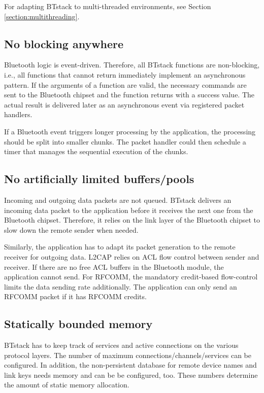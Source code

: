 \documentclass[a4paper,titlepage,oneside,12pt]{amsart} %
\begin{document}
For adapting BTstack to multi-threaded environments, see Section \ref{section:multithreading}.


\subsection{No blocking anywhere}

Bluetooth logic is event-driven. Therefore, all BTstack functions are non-blocking, i.e., all functions that cannot return immediately implement an asynchronous pattern. If the arguments of a function are valid, the necessary commands are sent to the Bluetooth chipset and the function returns with a success  value. The actual result is delivered later as an asynchronous event via registered packet handlers. 

If a Bluetooth event triggers longer processing by the application, the processing should be split into smaller chunks. The packet handler could then schedule a timer that manages the sequential execution of the chunks.

\subsection{No artificially limited buffers/pools}
Incoming and outgoing data packets are not queued. BTstack delivers an incoming data packet to the application before it receives the next one from the Bluetooth chipset. Therefore, it relies on the link layer of the Bluetooth chipset to slow down the remote sender when needed. 

Similarly, the application has to adapt its packet generation to the remote receiver for outgoing data. 
L2CAP relies on ACL flow control between sender and receiver. If there are no free ACL buffers in the Bluetooth module, the application cannot send.  For RFCOMM, the mandatory credit-based flow-control limits the data sending rate additionally. The application can only send an RFCOMM packet if it has RFCOMM credits.

\subsection{Statically bounded memory}
BTstack has to keep track of services and active connections on the various protocol layers. The number of maximum connections/channels/services can be configured. In addition, the non-persistent database for remote device names and link keys needs memory and can be be configured, too. These numbers determine the amount of static memory allocation.
\end{document}
